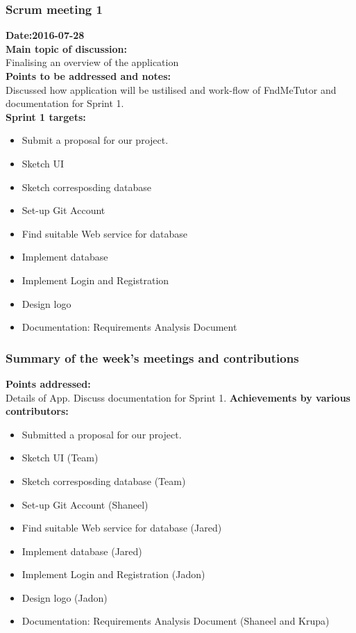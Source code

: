 \documentclass[12pt]{article}
\begin{document}
{\subsubsection{Scrum meeting 1}
\textbf{Date:2016-07-28}\\
\textbf{Main topic of discussion:}\\
Finalising an overview of the application\\
\textbf{Points to be addressed and notes:}\\
Discussed how application will be ustilised and work-flow of FndMeTutor and documentation for Sprint 1.\\
\textbf{Sprint 1 targets:} \\
\begin{itemize}
\item Submit a proposal for our project.
\item Sketch UI
\item Sketch corresposding database
\item Set-up Git Account
\item Find suitable Web service for database
\item Implement database
\item Implement Login and Registration
\item Design logo
\item Documentation: Requirements Analysis Document
\end{itemize}

\subsubsection{Summary of the week's meetings and contributions}
\textbf{Points addressed:} \\
Details of App. Discuss documentation for Sprint 1.
\textbf{Achievements by various contributors:}
\begin{itemize}
\item Submitted a proposal for our project.
\item Sketch UI (Team)
\item Sketch corresposding database (Team)
\item Set-up Git Account (Shaneel)
\item Find suitable Web service for database (Jared)
\item Implement database (Jared)
\item Implement Login and Registration (Jadon)
\item Design logo (Jadon)
\item Documentation: Requirements Analysis Document (Shaneel and Krupa)
\end{itemize}
}
\end{document}
